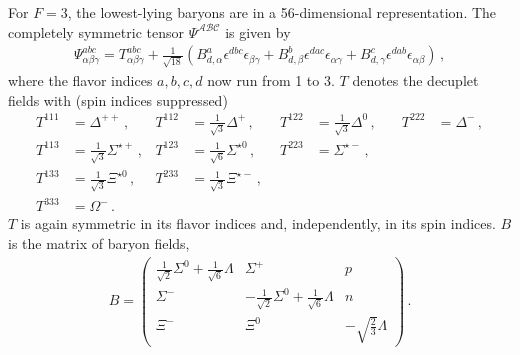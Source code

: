 \documentclass[nofootinbib, preprint, aps, prc, superscriptaddress,11pt]{revtex4-1}
\newcommand{\1}{\mathbbm{1}}
\newcommand{\Om}{\ensuremath{\Omega}\xspace}
\begin{document}
For $F=3$, the lowest-lying baryons are in a 56-dimensional representation. 
The completely symmetric tensor $\Psi^{\mathcal{A}\mathcal{B}\mathcal{C}}$ is given by \cite{Kaplan:1995yg}
\begin{align}\label{eq:56plet}
    \Psi^{abc}_{\alpha\beta\gamma} = T^{abc}_{\alpha\beta\gamma} + \frac{1}{\sqrt{18}} \left( B^a_{d,\alpha} \epsilon^{dbc} \epsilon_{\beta\gamma} + B^b_{d,\beta} \epsilon^{dac} \epsilon_{\alpha\gamma} + B^c_{d,\gamma} \epsilon^{dab} \epsilon_{\alpha\beta}\right) \,,
\end{align}
where the flavor indices $a,b,c,d$ now run from 1 to 3. 
$T$ denotes the decuplet fields with (spin indices suppressed)
\begin{equation}
\begin{aligned}
    T^{111} & = \Delta^{++}\,,\quad & T^{112} &= \frac{1}{\sqrt{3}}\Delta^{+}\,, \quad & T^{122} &= \frac{1}{\sqrt{3}}\Delta^{0}\,,\quad & T^{222} &= \Delta^{-}\,, \\
    T^{113} &= \frac{1}{\sqrt{3}}\Sigma^{\star +}\,, & T^{123} &= \frac{1}{\sqrt{6}} \Sigma^{\star 0}\,, & T^{223} &= \Sigma^{\star -}\,, \\
    T^{133} &= \frac{1}{\sqrt{3}}\Xi^{\star 0}\,, & T^{233} &= \frac{1}{\sqrt{3}}\Xi^{\star -}\,,\\
    T^{333} & = \Om^- \, .
\end{aligned}
\end{equation}
$T$ is again symmetric in its flavor indices and, independently, in its spin indices. 
$B$ is the matrix of baryon fields,
\begin{align}
    B=\begin{pmatrix}
        \frac{1}{\sqrt{2}}\Sigma^0 + \frac{1}{\sqrt{6}}\Lambda & \Sigma^+ & p \\
        \Sigma^- & - \frac{1}{\sqrt{2}}\Sigma^0 + \frac{1}{\sqrt{6}}\Lambda & n \\
        \Xi^- & \Xi^0 & -\sqrt{\frac{2}{3}} \Lambda
    \end{pmatrix} \, .
\end{align}
\end{document}

